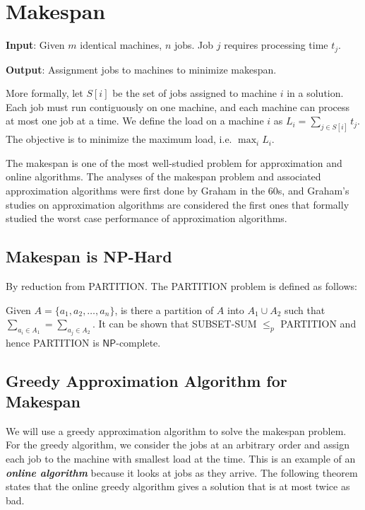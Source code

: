 \section{Makespan}

\textbf{Input}: Given $m$ identical machines, $n$ jobs. Job $j$ requires processing time $t_j$.

\textbf{Output}: Assignment jobs to machines to minimize makespan.

More formally, let $S[i]$ be the set of jobs assigned to machine $i$ in a solution. Each job must run contiguously on one machine, and each machine can process at most one job at a time. We define the load on a machine $i$ as $L_i = \sum_{j \in S[i]}t_j$. The objective is to minimize the maximum load, i.e. $\max_i L_i$.

The makespan is one of the most well-studied problem for approximation and online algorithms. The analyses of the makespan problem and associated approximation algorithms were first done by Graham in the 60s, and Graham's studies on approximation algorithms are considered the first ones that formally studied the worst case performance of approximation algorithms.

\subsection{Makespan is NP-Hard} 

By reduction from PARTITION. The PARTITION problem is defined as follows:

Given $A = \{a_1,a_2,\ldots,a_n\}$, is there a partition of $A$ into $A_1 \cup A_2$ such that $\sum_{a_i \in A_1} = \sum_{a_j \in A_2}$. It can be shown that SUBSET-SUM $\leq_p$ PARTITION and hence PARTITION is $\mathsf{NP}$-complete. 

\subsection{Greedy Approximation Algorithm for Makespan} 

We will use a greedy approximation algorithm to solve the makespan problem. For the greedy algorithm, we consider the jobs at an arbitrary order and assign each job to the machine with smallest load at the time. This is an example of an \textit{\textbf{online algorithm}} because it looks at jobs as they arrive. The following theorem states that the online greedy algorithm gives a solution that is at most twice as bad.

